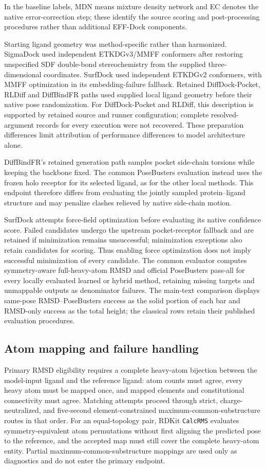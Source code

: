 \documentclass{article}
\begin{document}
In the baseline labels, MDN means mixture density network and EC denotes the native error-correction step; these identify the source scoring and post-processing procedures rather than additional EFF-Dock components.

Starting ligand geometry was method-specific rather than harmonized. SigmaDock used independent ETKDGv3/MMFF conformers after restoring unspecified SDF double-bond stereochemistry from the supplied three-dimensional coordinates. SurfDock used independent ETKDGv2 conformers, with MMFF optimization in its embedding-failure fallback. Retained DiffDock-Pocket, RLDiff and DiffBindFR paths used supplied local ligand geometry before their native pose randomization. For DiffDock-Pocket and RLDiff, this description is supported by retained source and runner configuration; complete resolved-argument records for every execution were not recovered. These preparation differences limit attribution of performance differences to model architecture alone.

DiffBindFR's retained generation path samples pocket side-chain torsions while keeping the backbone fixed. The common PoseBusters evaluation instead uses the frozen holo receptor for its selected ligand, as for the other local methods. This endpoint therefore differs from evaluating the jointly sampled protein--ligand structure and may penalize clashes relieved by native side-chain motion.

SurfDock attempts force-field optimization before evaluating its native confidence score. Failed candidates undergo the upstream pocket-receptor fallback and are retained if minimization remains unsuccessful; minimization exceptions also retain candidates for scoring. Thus enabling force optimization does not imply successful minimization of every candidate.
The common evaluator computes symmetry-aware full-heavy-atom RMSD and official PoseBusters pass-all for every locally evaluated learned or hybrid method, retaining missing targets and unmappable outputs as denominator failures.
The main-text comparison displays same-pose RMSD--PoseBusters success as the solid portion of each bar and RMSD-only success as the total height; the classical rows retain their published evaluation procedures.

\subsection{Atom mapping and failure handling}

Primary RMSD eligibility requires a complete heavy-atom bijection between the model-input ligand and the reference ligand: atom counts must agree, every heavy atom must be mapped once, and mapped elements and constitutional connectivity must agree.
Matching attempts proceed through strict, charge-neutralized, and five-second element-constrained maximum-common-substructure routes in that order.
For an equal-topology pair, RDKit \texttt{CalcRMS} evaluates symmetry-equivalent atom permutations without first aligning the predicted pose to the reference, and the accepted map must still cover the complete heavy-atom entity.
Partial maximum-common-substructure mappings are used only as diagnostics and do not enter the primary endpoint.
\end{document}

